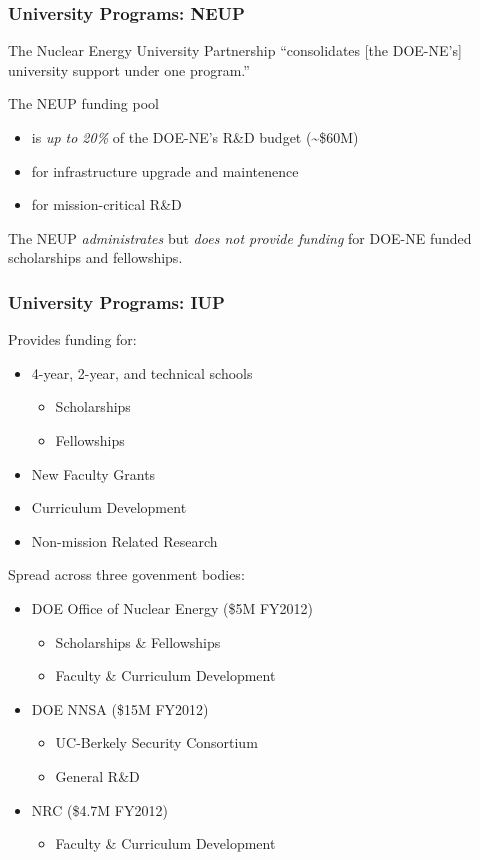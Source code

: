 \begin{frame}[ctb!]
  \frametitle{University Programs: NEUP}
  The Nuclear Energy University Partnership ``consolidates [the DOE-NE's] 
  university support under one program.''
  \vspace{0.4cm}
  \pause
  
  The NEUP funding pool
  \begin{itemize}
    \item is \emph{up to 20\%} of the DOE-NE's R\&D budget (\textasciitilde\$60M)
    \item for infrastructure upgrade and maintenence
    \item for mission-critical R\&D
  \end{itemize}
  \vspace{0.3cm}
  \pause
  
  The NEUP \emph{administrates} but \emph{does not provide funding} for
  DOE-NE funded scholarships and fellowships.
\end{frame}

\begin{frame}[ctb!]
  \frametitle{University Programs: IUP}
  Provides funding for:
  \begin{itemize}
    \item 4-year, 2-year, and technical schools
      \begin{itemize}
        \item Scholarships
        \item Fellowships
      \end{itemize}
    \item New Faculty Grants
    \item Curriculum Development
    \item Non-mission Related Research
  \end{itemize}
  \pause
  Spread across three govenment bodies:
  \begin{itemize}
    \item DOE Office of Nuclear Energy (\$5M FY2012)
      \begin{itemize}
        \item Scholarships \& Fellowships
        \item Faculty \& Curriculum Development
      \end{itemize}
    \item DOE NNSA (\$15M FY2012)
      \begin{itemize}
        \item UC-Berkely Security Consortium
        \item General R\&D
      \end{itemize}
    \item NRC (\$4.7M FY2012)
      \begin{itemize}
        \item Faculty \& Curriculum Development
       \end{itemize}
  \end{itemize}
\end{frame}
